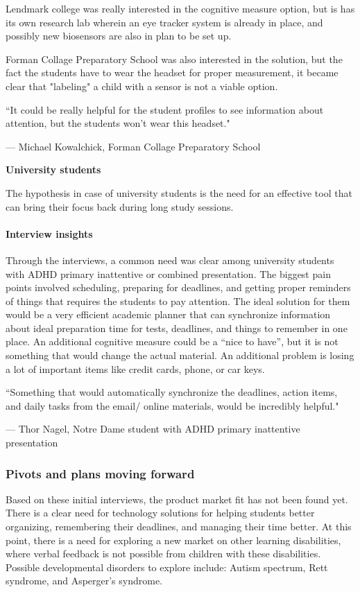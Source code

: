 \documentclass[letterpaper,10pt]{article}
\begin{document}
Lendmark college was really interested in the cognitive measure option, but is has its own research lab wherein an eye tracker system is already in place, and possibly new biosensors are also in plan to be set up.

Forman Collage Preparatory School was also interested in the solution, but the fact the students have to wear the headset for proper measurement, it became clear that "labeling" a child with a sensor is not a viable option.


\textcolor{myblue}{\epigraph{``It could be really helpful for the student profiles to see information about attention, but the students won't wear this headset."}{--- \textup{Michael Kowalchick}, Forman Collage Preparatory School}}

\textbf{University students}

The hypothesis in case of university students is the need for an effective tool that can bring their focus back during long study sessions. 

\paragraph{Interview insights}

Through the interviews, a common need was clear among university students with ADHD primary inattentive or combined presentation. The biggest pain points involved scheduling, preparing for deadlines, and getting proper reminders of things that requires the students to pay attention. The ideal solution for them would be a very efficient academic planner that can synchronize information about ideal preparation time for tests, deadlines, and things to remember in one place. An additional cognitive measure could be a “nice to have”, but it is not something that would change the actual material. An additional problem is losing a lot of important items like credit cards, phone, or car keys.

\textcolor{myblue}{\epigraph{``Something that would automatically synchronize the deadlines, action items, and daily tasks from the email/ online materials, would be incredibly helpful."}{--- \textup{Thor Nagel}, Notre Dame student with ADHD primary inattentive presentation}}


\subsubsection{Pivots and plans moving forward}

Based on these initial interviews, the product market fit has not been found yet. There is a clear need for technology solutions for helping students better organizing, remembering their deadlines, and managing their time better. At this point, there is a need for exploring a new market on other learning disabilities, where verbal feedback is not possible from children with these disabilities. Possible developmental disorders to explore include: Autism spectrum, Rett syndrome, and Asperger’s syndrome.
\end{document}
